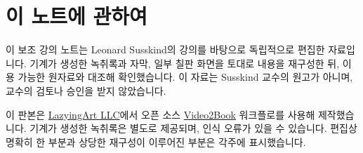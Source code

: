 \documentclass[11pt,oneside]{book}
\begin{document}
\frontmatter
\hypersetup{pageanchor=false}

\hypersetup{pageanchor=true}

\clearpage
\chapter{이 노트에 관하여}
이 보조 강의 노트는 Leonard Susskind의 강의를 바탕으로 독립적으로 편집한 자료입니다. 기계가 생성한 녹취록과 자막, 일부 칠판 화면을 토대로 내용을 재구성한 뒤, 이용 가능한 원자료와 대조해 확인했습니다. 이 자료는 Susskind 교수의 원고가 아니며, 교수의 검토나 승인을 받지 않았습니다.

이 판본은 \href{https://lazying.art}{LazyingArt LLC}에서 오픈 소스 \href{https://github.com/lachlanchen/Video2Book}{Video2Book} 워크플로를 사용해 제작했습니다. 기계가 생성한 녹취록은 별도로 제공되며, 인식 오류가 있을 수 있습니다. 편집상 명확히 한 부분과 상당한 재구성이 이루어진 부분은 각주에 표시했습니다.
\clearpage
\tableofcontents
\mainmatter










\end{document}

